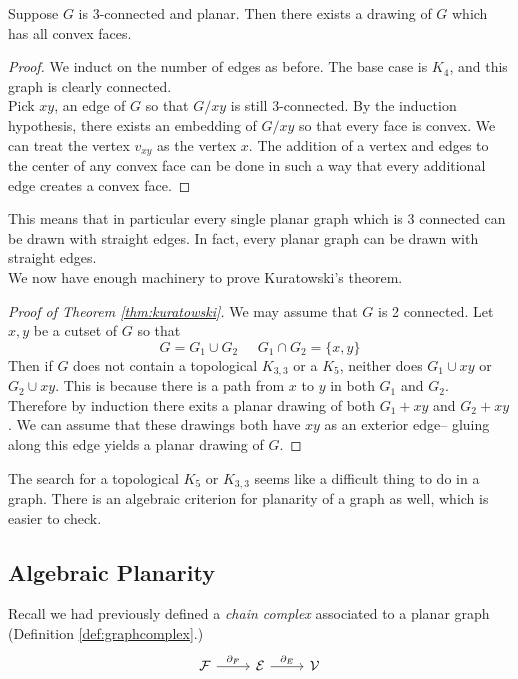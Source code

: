 \begin{corollary}
 Suppose $G$ is 3-connected and planar. Then there exists a drawing of $G$ which has all convex faces. 
\end{corollary}
\begin{proof}
 We induct on the number of edges as before. The base case is $K_4$, and this graph is clearly connected. \\
 Pick $xy$, an edge of $G$ so that $G/xy$ is still 3-connected. By the induction hypothesis, there exists an embedding of $G/xy$ so that every face is convex. We can treat the vertex $v_{xy}$ as the vertex $x$. The addition of a vertex and edges to the center of any convex face can be done in such a way that every additional edge creates a convex face. 
\end{proof}
This means that in particular every single planar graph which is 3 connected can be drawn with straight edges. In fact, every planar graph can be drawn with straight edges. \\
We now have enough machinery to prove Kuratowski's theorem. 
\begin{proof}[Proof of Theorem \ref{thm:kuratowski}]
 We may assume that $G$ is 2 connected. Let $x,y$ be a cutset of $G$ so that 
 \[G=G_1\cup G_2 \;\;\;\;\;G_1\cap G_2=\{x,y\}\]
 Then if $G$ does not contain a topological $K_{3,3}$ or a $K_5$, neither does $G_1\cup xy$ or $G_2\cup xy$. This is because there is a path from $x$ to $y$ in both $G_1$ and $G_2$. 
 Therefore by induction there exits a planar drawing of both $G_1+xy$ and $G_2+xy$. We can assume that these drawings both have $xy$ as an exterior edge-- gluing along this edge yields a planar drawing of $G$.
\end{proof}
The search for a topological $K_5$ or $K_{3,3}$ seems like a difficult thing to do in a graph. There is an algebraic criterion for planarity of a graph as well, which is easier to check.


\subsection{Algebraic Planarity}

Recall we had previously defined a \emph{chain complex} associated to a planar graph (Definition \ref{def:graphcomplex}.)
\[ \begin{tikzcd} 
\mathcal F \arrow{r}{\partial_F}& \mathcal E \arrow{r}{\partial_E}& \mathcal V 
\end{tikzcd}\]

